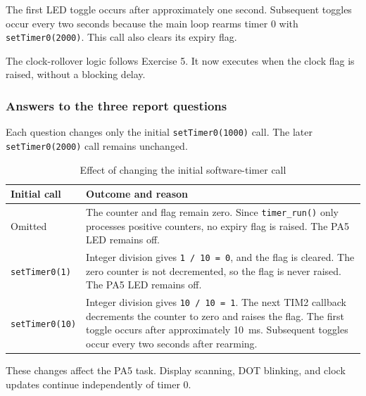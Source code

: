 \documentclass[a4paper]{article}
\begin{document}
The first LED toggle occurs after approximately
one second. Subsequent toggles occur every
two seconds because the main loop rearms
timer 0 with \texttt{setTimer0(2000)}.
This call also clears its expiry flag.

The clock-rollover logic follows Exercise 5.
It now executes when the clock flag is raised,
without a blocking delay.

\subsubsection{Answers to the three report questions}

Each question changes only the initial
\texttt{setTimer0(1000)} call.
The later \texttt{setTimer0(2000)} call
remains unchanged.

\begin{table}[H]
    \centering
    \caption{Effect of changing the initial software-timer call}
    \label{tab:ex06-questions}
    \begin{tabular}{
        >{\raggedright\arraybackslash}p{}
        >{\raggedright\arraybackslash}p{}}
        \toprule
        \textbf{Initial call} &
        \textbf{Outcome and reason} \\
        \midrule

        Omitted &
        The counter and flag remain zero.
        Since \texttt{timer\_run()} only processes
        positive counters, no expiry flag is raised.
        The PA5 LED remains off. \\

        \addlinespace
        \texttt{setTimer0(1)} &
        Integer division gives
        \texttt{1 / 10 = 0}, and the flag is cleared.
        The zero counter is not decremented,
        so the flag is never raised.
        The PA5 LED remains off. \\

        \addlinespace
        \texttt{setTimer0(10)} &
        Integer division gives
        \texttt{10 / 10 = 1}.
        The next TIM2 callback decrements the
        counter to zero and raises the flag.
        The first toggle occurs after approximately
        10~ms. Subsequent toggles occur every
        two seconds after rearming. \\

        \bottomrule
    \end{tabular}
\end{table}

These changes affect the PA5 task.
Display scanning, DOT blinking, and clock
updates continue independently of timer 0.
\end{document}
